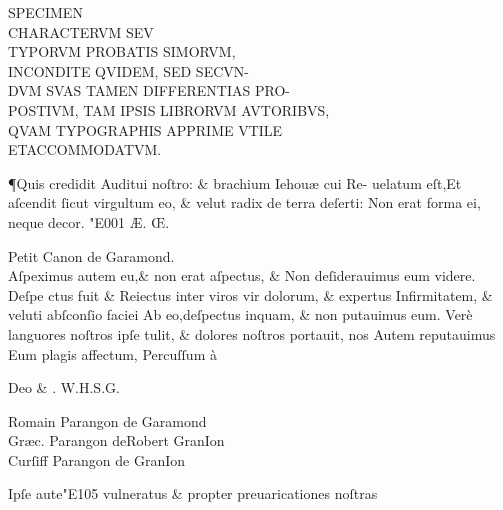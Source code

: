 \documentclass{article}
\newcommand{\threecolumntypefacenames}[3]{\begin{multicols}{3}
		\tiny
		\hfill \qquad \qquad \qquad \qquad #1\hspace*{\fill}\\
		\columnbreak
		\hfill #2\hspace*{\fill}\\
		\columnbreak
		\hfill #3\qquad \qquad \qquad \qquad \hspace*{\fill}
\end{multicols}}
\begin{document}
\centering
{{
		\fontsize{19}{16}\selectfont  SPECIMEN \\
		\fontsize{41}{33}\selectfont CHARACTERVM SEV \\
		\fontsize{23}{25}\selectfont TYPORVM PROBATIS SIMORVM\kern-3pt, \\
		\fontsize{19}{17}\selectfont INCONDITE QVIDEM, SED SECVN\kern-3pt-\\
		\fontsize{14}{16}\selectfont DVM SVAS TAMEN DIFFERENTIAS PRO\kern-2pt- \\
		\fontsize{9.5}{11.5}\selectfont POSTIVM, TAM IPSIS LIBRORVM AVTORIBVS\kern-2pt,\\
		\fontsize{7}{9}\selectfont QVAM TYPOGRAPHIS APPRIME VTILE\\
		\fontsize{5}{4}\selectfont ET\quad ACCOMMODATVM.\\}

\justifying
\huge
\noindent \P \quad \enspace Quis credidit Auditui noſtro: \& brachium Iehou\ae{} cui Re-\linebreak
uelatum eſt,Et aſcendit ſicut virgultum  eo, \& velut\linebreak
radix de terra deſerti: Non erat forma ei, neque decor. \char"E001{} \AE{}. \OE .\linebreak

\vspace{-0.7\baselineskip}
\small
\centering
Petit Canon de Garamond.\\
\vspace{-0.5\baselineskip}
\Large
\justifying
Aſpeximus autem eu,\& non erat aſpectus, \& Non deſiderauimus eum videre. Deſpe \linebreak
ctus fuit \& Reiectus inter viros vir dolorum, \& expertus Infirmitatem, \& veluti abſconſio \linebreak
faciei Ab eo,deſpectus inquam, \& non putauimus eum. Ver\`e languores noſtros ipſe tulit, \linebreak
\& dolores noſtros portauit, nos Autem reputauimus Eum plagis affectum, Percuſſum \`a\linebreak

\centering
\vspace{-1\baselineskip}
Deo \& . \quad W.\quad H.\quad S.\quad G.\\
\vspace{-\baselineskip}
\threecolumntypefacenames{Romain Parangon de Garamond}{Gr\ae{}c. Parangon deRobert GranIon\quad\quad\quad\quad\quad\quad\quad\quad\quad\quad }{Curſiff Parangon de GranIon}
\vspace*{-\baselineskip}
\scriptsize
\begin{multicols}{2}
	\justifying
	\normalsize
	\justifying
	{Ipſe aute\char"E105{} vulneratus \& propter preuaricationes noſtras\linebreak}


\end{multicols}}
\end{document}
